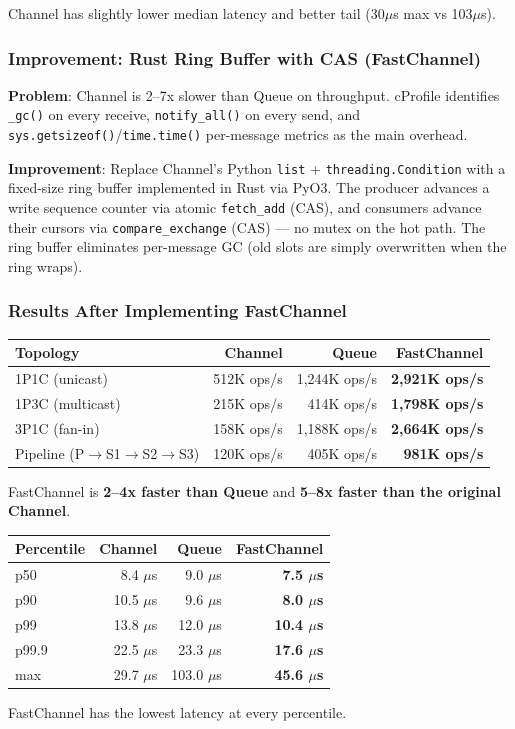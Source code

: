 Channel has slightly lower median latency and better tail (30$\mu$s max vs 103$\mu$s).

\subsubsection{Improvement: Rust Ring Buffer with CAS (FastChannel)}

\textbf{Problem}: Channel is 2--7x slower than Queue on throughput. cProfile identifies \texttt{\_gc()} on every receive, \texttt{notify\_all()} on every send, and \texttt{sys.getsizeof()}/\texttt{time.time()} per-message metrics as the main overhead.

\textbf{Improvement}: Replace Channel's Python \texttt{list} + \texttt{threading.Condition} with a fixed-size ring buffer implemented in Rust via PyO3. The producer advances a write sequence counter via atomic \texttt{fetch\_add} (CAS), and consumers advance their cursors via \texttt{compare\_exchange} (CAS) --- no mutex on the hot path. The ring buffer eliminates per-message GC (old slots are simply overwritten when the ring wraps).

\subsubsection{Results After Implementing FastChannel}

\begin{table}[h]
\centering
\begin{tabular}{|l|r|r|r|}
\hline
\textbf{Topology} & \textbf{Channel} & \textbf{Queue} & \textbf{FastChannel} \\
\hline
1P1C (unicast) & 512K ops/s & 1,244K ops/s & \textbf{2,921K ops/s} \\
1P3C (multicast) & 215K ops/s & 414K ops/s & \textbf{1,798K ops/s} \\
3P1C (fan-in) & 158K ops/s & 1,188K ops/s & \textbf{2,664K ops/s} \\
Pipeline (P$\rightarrow$S1$\rightarrow$S2$\rightarrow$S3) & 120K ops/s & 405K ops/s & \textbf{981K ops/s} \\
\hline
\end{tabular}
\end{table}

FastChannel is \textbf{2--4x faster than Queue} and \textbf{5--8x faster than the original Channel}.

\begin{table}[h]
\centering
\begin{tabular}{|l|r|r|r|}
\hline
\textbf{Percentile} & \textbf{Channel} & \textbf{Queue} & \textbf{FastChannel} \\
\hline
p50 & 8.4 $\mu$s & 9.0 $\mu$s & \textbf{7.5 $\mu$s} \\
p90 & 10.5 $\mu$s & 9.6 $\mu$s & \textbf{8.0 $\mu$s} \\
p99 & 13.8 $\mu$s & 12.0 $\mu$s & \textbf{10.4 $\mu$s} \\
p99.9 & 22.5 $\mu$s & 23.3 $\mu$s & \textbf{17.6 $\mu$s} \\
max & 29.7 $\mu$s & 103.0 $\mu$s & \textbf{45.6 $\mu$s} \\
\hline
\end{tabular}
\end{table}

FastChannel has the lowest latency at every percentile.
